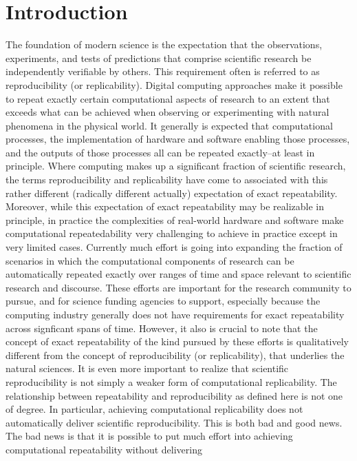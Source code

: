 \section{Introduction}

	The foundation of modern science  is the expectation that the observations, experiments, and
		tests of predictions that comprise scientific research be independently verifiable by others.
	This requirement often is referred to as reproducibility (or replicability).
	Digital computing approaches make it possible to repeat exactly certain computational aspects of research
		to an extent that exceeds what can be achieved when observing or experimenting with natural 
		phenomena in the physical world.  
	It generally is expected that computational processes, the implementation of hardware and software 
		enabling those processes, and the outputs of those processes all can be repeated exactly--at least in principle.
	Where computing makes up a significant fraction of scientific research, the terms reproducibility and
		replicability have come to associated with this rather different (radically different actually) expectation of 
		exact repeatability. 
	Moreover, while this expectation of exact repeatability may be realizable in principle, in practice the complexities of real-world
		hardware and software make  computational repeatedability very challenging to achieve in practice except in very limited cases.
	Currently much effort is going into expanding the fraction of scenarios in which the computational
		components of research can be automatically repeated exactly over ranges of time and space relevant to scientific 
		research and discourse.
	These efforts are important for the research community to pursue, and for science funding
		agencies to support, especially because the computing industry generally does not have 
		requirements for exact repeatability across signficant spans of time.
	However, it also is crucial to note that the concept of exact repeatability of the kind pursued by these efforts is 
		qualitatively different from the concept of reproducibility (or replicability), that underlies the natural sciences.
	It is even more important to realize that scientific reproducibility is not simply a weaker form of computational
		replicability.  
	The relationship between repeatability and reproducibility as defined here is not one of degree.
	In particular, achieving computational replicability does not automatically deliver scientific reproducibility.
	This is both bad and good news.
	The bad news is that it is possible to put much effort into achieving computational repeatability without delivering
